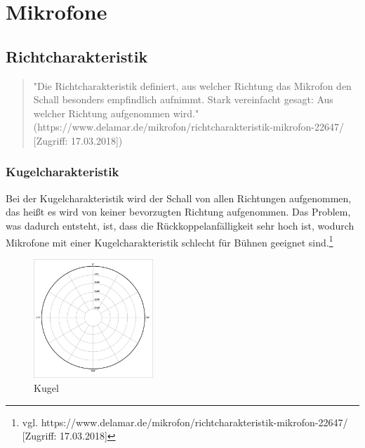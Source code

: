 \section{Mikrofone}
\subsection{Richtcharakteristik}
\begin{quote}
"Die Richtcharakteristik definiert, aus welcher Richtung das Mikrofon den Schall besonders empfindlich aufnimmt. Stark vereinfacht gesagt: Aus welcher Richtung aufgenommen wird." (https://www.delamar.de/mikrofon/richtcharakteristik-mikrofon-22647/ [Zugriff: 17.03.2018])
\end{quote}
\subsubsection{Kugelcharakteristik}
Bei der Kugelcharakteristik wird der Schall von allen Richtungen aufgenommen, das heißt es wird von keiner bevorzugten Richtung aufgenommen. Das Problem, was dadurch entsteht, ist, dass die Rückkoppelanfälligkeit sehr hoch ist, wodurch Mikrofone mit einer Kugelcharakteristik schlecht für Bühnen geeignet sind.\footnote{\label{}vgl. https://www.delamar.de/mikrofon/richtcharakteristik-mikrofon-22647/ [Zugriff: 17.03.2018]}
\begin{figure}[H]
	\centering
	\includegraphics[width=0.4\textwidth]{abb4} 
	\caption[Kugel]{Kugel\footnotemark}
\end{figure}
